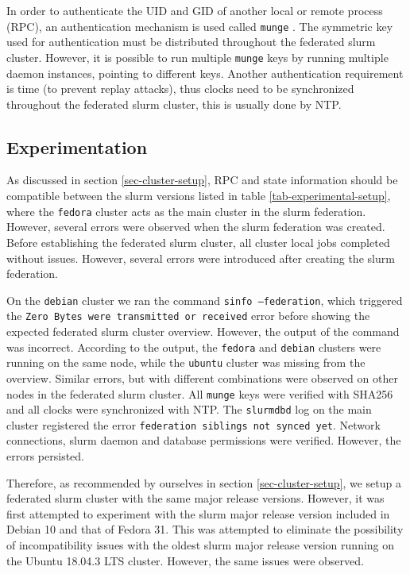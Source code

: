 \documentclass[conference]{IEEEtran}
\begin{document}
In order to authenticate the UID and GID of another local or remote process (RPC), an authentication mechanism is used called \texttt{munge} \cite{github-munge}. The symmetric key used for authentication must be distributed throughout the federated \gls{slurm} cluster. However, it is possible to run multiple \texttt{munge} keys by running multiple daemon instances, pointing to different keys. Another authentication requirement is time (to prevent replay attacks), thus clocks need to be synchronized throughout the federated \gls{slurm} cluster, this is usually done by NTP.


\subsection{Experimentation}
\label{sec-experimentation}
As discussed in section \ref{sec-cluster-setup}, RPC and state information should be compatible between the \gls{slurm} versions listed in table \ref{tab-experimental-setup}, where the \texttt{fedora} cluster acts as the main cluster in the \gls{slurm} federation. However, several errors were observed when the \gls{slurm} federation was created. Before establishing the federated \gls{slurm} cluster, all cluster local jobs completed without issues. However, several errors were introduced after creating the \gls{slurm} federation.

On the \texttt{debian} cluster we ran the command \texttt{sinfo --federation}, which triggered the \texttt{Zero Bytes were transmitted or received} error before showing the expected federated \gls{slurm} cluster overview. However, the output of the command was incorrect. According to the output, the \texttt{fedora} and \texttt{debian} clusters were running on the same node, while the \texttt{ubuntu} cluster was missing from the overview. Similar errors, but with different combinations were observed on other nodes in the federated \gls{slurm} cluster. All \texttt{munge} keys were verified with SHA256 and all clocks were synchronized with NTP. The \texttt{slurmdbd} log on the main cluster registered the error \texttt{federation siblings not synced yet}. Network connections, \gls{slurm} daemon and database permissions were verified. However, the errors persisted.

Therefore, as recommended by ourselves in section \ref{sec-cluster-setup}, we setup a federated \gls{slurm} cluster with the same major release versions. However, it was first attempted to experiment with the \gls{slurm} major release version included in Debian 10 and that of Fedora 31. This was attempted to eliminate the possibility of incompatibility issues with the oldest \gls{slurm} major release version running on the Ubuntu 18.04.3 LTS cluster. However, the same issues were observed.
\end{document}
